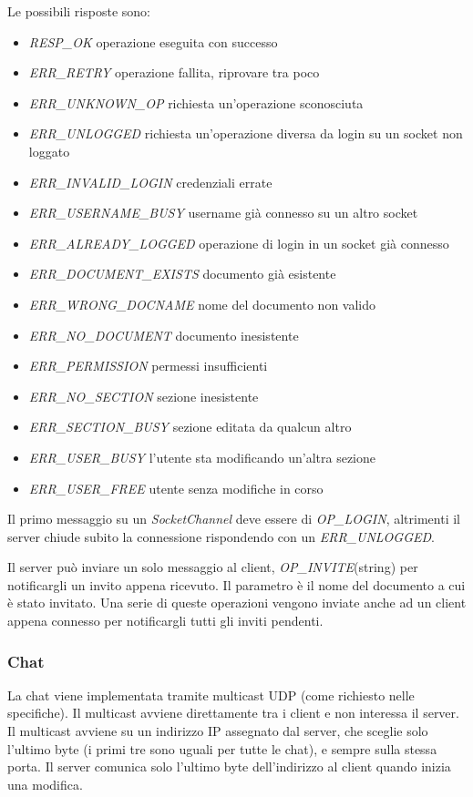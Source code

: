 \documentclass[a4paper]{article}
\theoremstyle{theorem}
\theoremstyle{remark}
\theoremstyle{definition}
\theoremstyle{corollary}
\theoremstyle{lemma}
\begin{document}
Le possibili risposte sono:
\begin{itemize}
	\item \textit{RESP\_OK} operazione eseguita con successo
	\item \textit{ERR\_RETRY} operazione fallita, riprovare tra poco
	\item \textit{ERR\_UNKNOWN\_OP} richiesta un'operazione sconosciuta
	\item \textit{ERR\_UNLOGGED} richiesta un'operazione diversa da login su un socket non loggato
	\item \textit{ERR\_INVALID\_LOGIN} credenziali errate
	\item \textit{ERR\_USERNAME\_BUSY} username già connesso su un altro socket
	\item \textit{ERR\_ALREADY\_LOGGED} operazione di login in un socket già connesso
	\item \textit{ERR\_DOCUMENT\_EXISTS} documento già esistente
	\item \textit{ERR\_WRONG\_DOCNAME} nome del documento non valido
	\item \textit{ERR\_NO\_DOCUMENT} documento inesistente
	\item \textit{ERR\_PERMISSION} permessi insufficienti
	\item \textit{ERR\_NO\_SECTION} sezione inesistente
	\item \textit{ERR\_SECTION\_BUSY} sezione editata da qualcun altro
	\item \textit{ERR\_USER\_BUSY} l'utente sta modificando un'altra sezione
	\item \textit{ERR\_USER\_FREE} utente senza modifiche in corso
\end{itemize}

Il primo messaggio su un \textit{SocketChannel} deve essere di \textit{OP\_LOGIN}, altrimenti il server chiude subito la connessione rispondendo con un \textit{ERR\_UNLOGGED}.

Il server può inviare un solo messaggio al client, \textit{OP\_INVITE}(string) per notificargli un invito appena ricevuto. Il parametro è il nome del documento a cui è stato invitato. Una serie di queste operazioni vengono inviate anche ad un client appena connesso per notificargli tutti gli inviti pendenti.

\subsubsection{Chat}
La chat viene implementata tramite multicast UDP (come richiesto nelle specifiche). Il multicast avviene direttamente tra i client e non interessa il server. Il multicast avviene su un indirizzo IP assegnato dal server, che sceglie solo l'ultimo byte (i primi tre sono uguali per tutte le chat), e sempre sulla stessa porta. Il server comunica solo l'ultimo byte dell'indirizzo al client quando inizia una modifica.
\end{document}

